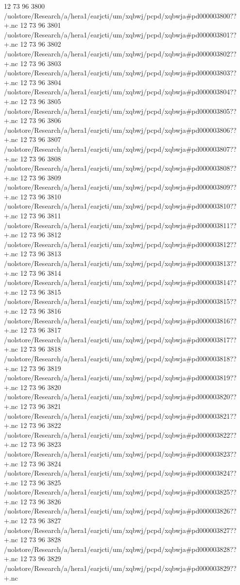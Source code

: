 12 73 96
3800
/uolstore/Research/a/hera1/earjcti/um/xqbwj/pcpd/xqbwja#pd000003800??+.nc
12 73 96
3801
/uolstore/Research/a/hera1/earjcti/um/xqbwj/pcpd/xqbwja#pd000003801??+.nc
12 73 96
3802
/uolstore/Research/a/hera1/earjcti/um/xqbwj/pcpd/xqbwja#pd000003802??+.nc
12 73 96
3803
/uolstore/Research/a/hera1/earjcti/um/xqbwj/pcpd/xqbwja#pd000003803??+.nc
12 73 96
3804
/uolstore/Research/a/hera1/earjcti/um/xqbwj/pcpd/xqbwja#pd000003804??+.nc
12 73 96
3805
/uolstore/Research/a/hera1/earjcti/um/xqbwj/pcpd/xqbwja#pd000003805??+.nc
12 73 96
3806
/uolstore/Research/a/hera1/earjcti/um/xqbwj/pcpd/xqbwja#pd000003806??+.nc
12 73 96
3807
/uolstore/Research/a/hera1/earjcti/um/xqbwj/pcpd/xqbwja#pd000003807??+.nc
12 73 96
3808
/uolstore/Research/a/hera1/earjcti/um/xqbwj/pcpd/xqbwja#pd000003808??+.nc
12 73 96
3809
/uolstore/Research/a/hera1/earjcti/um/xqbwj/pcpd/xqbwja#pd000003809??+.nc
12 73 96
3810
/uolstore/Research/a/hera1/earjcti/um/xqbwj/pcpd/xqbwja#pd000003810??+.nc
12 73 96
3811
/uolstore/Research/a/hera1/earjcti/um/xqbwj/pcpd/xqbwja#pd000003811??+.nc
12 73 96
3812
/uolstore/Research/a/hera1/earjcti/um/xqbwj/pcpd/xqbwja#pd000003812??+.nc
12 73 96
3813
/uolstore/Research/a/hera1/earjcti/um/xqbwj/pcpd/xqbwja#pd000003813??+.nc
12 73 96
3814
/uolstore/Research/a/hera1/earjcti/um/xqbwj/pcpd/xqbwja#pd000003814??+.nc
12 73 96
3815
/uolstore/Research/a/hera1/earjcti/um/xqbwj/pcpd/xqbwja#pd000003815??+.nc
12 73 96
3816
/uolstore/Research/a/hera1/earjcti/um/xqbwj/pcpd/xqbwja#pd000003816??+.nc
12 73 96
3817
/uolstore/Research/a/hera1/earjcti/um/xqbwj/pcpd/xqbwja#pd000003817??+.nc
12 73 96
3818
/uolstore/Research/a/hera1/earjcti/um/xqbwj/pcpd/xqbwja#pd000003818??+.nc
12 73 96
3819
/uolstore/Research/a/hera1/earjcti/um/xqbwj/pcpd/xqbwja#pd000003819??+.nc
12 73 96
3820
/uolstore/Research/a/hera1/earjcti/um/xqbwj/pcpd/xqbwja#pd000003820??+.nc
12 73 96
3821
/uolstore/Research/a/hera1/earjcti/um/xqbwj/pcpd/xqbwja#pd000003821??+.nc
12 73 96
3822
/uolstore/Research/a/hera1/earjcti/um/xqbwj/pcpd/xqbwja#pd000003822??+.nc
12 73 96
3823
/uolstore/Research/a/hera1/earjcti/um/xqbwj/pcpd/xqbwja#pd000003823??+.nc
12 73 96
3824
/uolstore/Research/a/hera1/earjcti/um/xqbwj/pcpd/xqbwja#pd000003824??+.nc
12 73 96
3825
/uolstore/Research/a/hera1/earjcti/um/xqbwj/pcpd/xqbwja#pd000003825??+.nc
12 73 96
3826
/uolstore/Research/a/hera1/earjcti/um/xqbwj/pcpd/xqbwja#pd000003826??+.nc
12 73 96
3827
/uolstore/Research/a/hera1/earjcti/um/xqbwj/pcpd/xqbwja#pd000003827??+.nc
12 73 96
3828
/uolstore/Research/a/hera1/earjcti/um/xqbwj/pcpd/xqbwja#pd000003828??+.nc
12 73 96
3829
/uolstore/Research/a/hera1/earjcti/um/xqbwj/pcpd/xqbwja#pd000003829??+.nc

